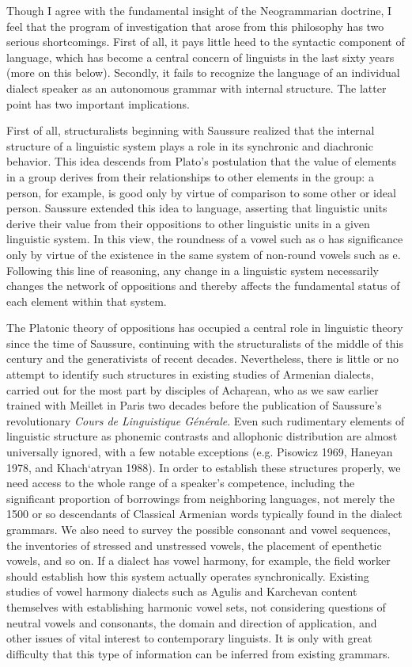 \begin{exe}
Though I agree with the fundamental insight of the Neogrammarian doctrine, I feel that the program of investigation that arose from this philosophy has two serious shortcomings. First of all, it pays little heed to the syntactic component of language, which has become a central concern of linguists in the last sixty years (more on this below). Secondly, it fails to recognize the language of an individual dialect speaker as an autonomous grammar with internal structure. The latter point has two important implications.

First of all, structuralists beginning with Saussure realized that the internal structure of a linguistic system plays a role in its synchronic and diachronic behavior. This idea descends from Plato’s postulation that the value of elements in a group derives from their relationships to other elements in the group: a person, for example, is good only by virtue of comparison to some other or ideal person. Saussure extended this idea to language, asserting that linguistic units derive their value from their oppositions to other linguistic units in a given linguistic system. In this view, the roundness of a vowel such as o has significance only by virtue of the existence in the same system of non-round vowels such as e. Following this line of reasoning, any change in a linguistic system necessarily changes the network of oppositions and thereby affects the fundamental status of each element within that system.

The Platonic theory of oppositions has occupied a central role in linguistic theory since the time of Saussure, continuing with the structuralists of the middle of this century and the generativists of recent decades. Nevertheless, there is little or no attempt to identify such structures in existing studies of Armenian dialects, carried out for the most part by disciples of Achaṛean, who as we saw earlier trained with Meillet in Paris two decades before the publication of Saussure’s revolutionary \textit{Cours de Linguistique Générale}. Even such rudimentary elements of linguistic structure as phonemic contrasts and allophonic distribution are almost universally ignored, with a few notable exceptions (e.g. Pisowicz 1969, Haneyan 1978, and Khach‘atryan 1988). In order to establish these structures properly, we need access to the whole range of a speaker’s competence, including the significant proportion of borrowings from neighboring languages, not merely the 1500 or so descendants of Classical Armenian words typically found in the dialect grammars. We also need to survey the possible consonant and vowel sequences, the inventories of stressed and unstressed vowels, the placement of epenthetic vowels, and so on. If a dialect has vowel harmony, for example, the field worker should establish how this system actually operates synchronically. Existing studies of vowel harmony dialects such as Agulis and Karchevan content themselves with establishing harmonic vowel sets, not considering questions of neutral vowels and consonants, the domain and direction of application, and other issues of vital interest to contemporary linguists. It is only with great difficulty that this type of information can be inferred from existing grammars.


\end{exe}
